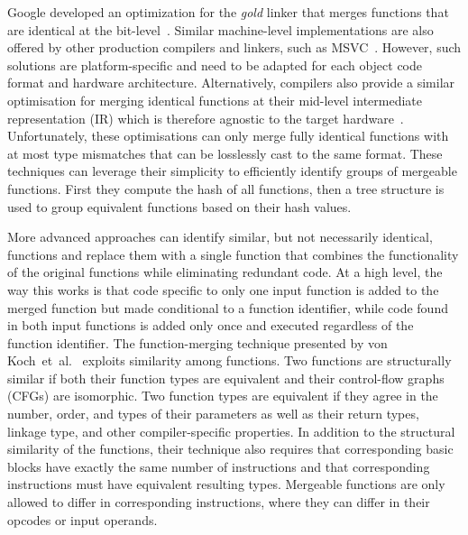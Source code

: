 Google developed an optimization for the \textit{gold} linker that merges
functions that are identical at the bit-level~\cite{tallam10,kwan12}. 
Similar machine-level implementations are also offered by other production compilers
and linkers, such as MSVC~\cite{msvc-icf}.
However, such solutions are platform-specific and need to be adapted for each object code format and hardware architecture.
Alternatively, compilers also provide a similar optimisation for merging identical functions at their mid-level intermediate representation (IR) which is therefore agnostic to the target hardware~\cite{llvm-fm,livska14}.
Unfortunately, these optimisations can only merge fully identical functions with at most type mismatches that can be losslessly cast to the same format.
These techniques can leverage their simplicity to efficiently identify groups of mergeable functions.
First they compute the hash of all functions, then a tree structure is used to group equivalent functions based on their hash values.

More advanced approaches can identify similar, but not necessarily identical, functions and replace them with a single function that combines the functionality of the original functions while eliminating redundant code.
At a high level, the way this works is that code specific to only one input function is added to the merged function but made conditional to a function identifier, while code found in both input functions is added only once and executed regardless of the function identifier.
The function-merging technique presented by von Koch~et~al.~\cite{edler14} exploits similarity among functions.
Two functions are structurally similar if both their function types are equivalent
and their control-flow graphs (CFGs) are isomorphic.
Two function types are equivalent if they agree in the number, order, and types
of their parameters as well as
their return types, linkage type, and other compiler-specific properties.
In addition to the structural similarity of the functions, their technique also
requires that corresponding basic blocks have exactly the same number of instructions
and that corresponding instructions must have equivalent resulting types.
Mergeable functions are only allowed to differ in corresponding instructions,
where they can differ in their opcodes or input operands.

